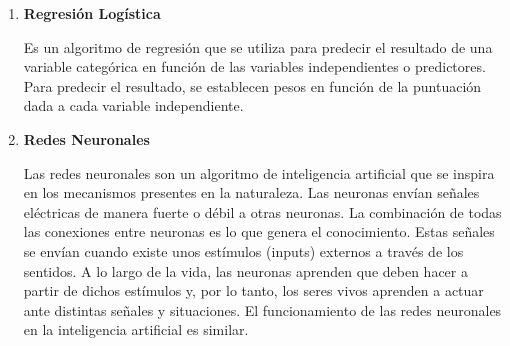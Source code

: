 \begin{enumerate}

	
	\item \textbf{Regresión Logística}
	
	Es un algoritmo de regresión que se utiliza para predecir el resultado de una variable categórica en función de las variables independientes o predictores. Para predecir el resultado, se establecen pesos en función de la puntuación dada a cada variable independiente.
	
	\item \textbf{Redes Neuronales}
	
	Las redes neuronales son un algoritmo de inteligencia artificial que se inspira en los mecanismos presentes en la naturaleza. Las neuronas envían señales eléctricas de manera fuerte o débil a otras neuronas. La combinación de todas las conexiones entre neuronas es lo que genera el conocimiento. Estas señales se envían cuando existe unos estímulos (inputs) externos a través de los sentidos. A lo largo de la vida, las neuronas aprenden que deben hacer a partir de dichos estímulos y, por lo tanto, los seres vivos aprenden a actuar ante distintas señales y situaciones. El funcionamiento de las redes neuronales en la inteligencia artificial es similar.
	

\end{enumerate}
